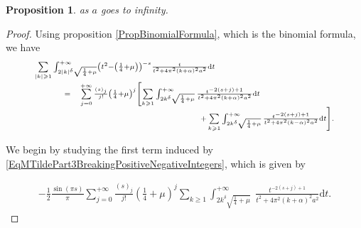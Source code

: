 \documentclass{jams-l}
\newtheorem{proposition}[theorem]{Proposition}
\theoremstyle{definition}
\theoremstyle{remark}
\numberwithin{equation}{section}
\begin{document}
\begin{proposition}
                    \noindent as $a$ goes to infinity.
                
                \end{proposition}
                
                \begin{proof}
                
                    Using proposition \ref{PropBinomialFormula}, which is the binomial formula, we have
                    \begin{equation}
                    \label{EqMTildePart3BreakingPositiveNegativeIntegers}
                        \begin{array}{lll}
                            \multicolumn{3}{l}{\scriptstyle \sum\limits_{\left \vert k \right \vert \geqslant 1} \int_{2 \left \vert k \right \vert^{\delta} \sqrt{\frac{1}{4} + \mu}}^{+ \infty} \left( t^2 - \left( \frac{1}{4} + \mu \right) \right)^{-s} \frac{t}{t^2 + 4 \pi^2 \left( k + \alpha \right)^2 a^2} \mathrm{d}t} \\[1em]
                            
                            \qquad & \scriptstyle = & \scriptstyle \sum\limits_{j = 0}^{+ \infty} \frac{\left( s \right)_j}{j!} \left( \frac{1}{4} + \mu \right)^j \left[ \sum\limits_{k \geqslant 1} \int_{2 k^{\delta} \sqrt{\frac{1}{4} + \mu}}^{+ \infty} \frac{t^{-2 \left( s+j \right) + 1}}{t^2 + 4 \pi^2 \left( k + \alpha \right)^2 a^2} \mathrm{d}t \right. \\[0.5em] 
                            
                            && \scriptstyle \qquad \qquad \qquad \qquad \qquad \qquad \left. +\sum\limits_{k \geqslant 1} \int_{2 k^{\delta} \sqrt{\frac{1}{4} + \mu}}^{+ \infty} \frac{t^{-2 \left( s+j \right) + 1}}{t^2 + 4 \pi^2 \left( k - \alpha \right)^2 a^2} \mathrm{d}t \right].
                        \end{array}
                    \end{equation}
                    
                    \noindent We begin by studying the first term induced by \ref{EqMTildePart3BreakingPositiveNegativeIntegers}, which is given by
                    
                    \[ \begin{array}{c}
                            - \frac{1}{2} \frac{\sin \left( \pi s \right)}{\pi} \sum\limits_{j = 0}^{+ \infty} \frac{\left( s \right)_j}{j!} \left( \frac{1}{4} + \mu \right)^j \sum\limits_{k \geqslant 1} \int_{2 k^{\delta} \sqrt{\frac{1}{4} + \mu}}^{+ \infty} \; \frac{t^{-2 \left( s+j \right) + 1}}{t^2 + 4 \pi^2 \left( k + \alpha \right)^2 a^2} \mathrm{d}t.
                        \end{array} \]
                    

\end{proof}
\end{document}
